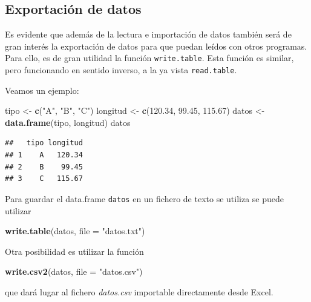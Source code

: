 \documentclass[]{book}
\newenvironment{Shaded}{\begin{snugshade}}{\end{snugshade}}
\newcommand{\KeywordTok}[1]{\textcolor[rgb]{0.13,0.29,0.53}{\textbf{#1}}}
\newcommand{\DataTypeTok}[1]{\textcolor[rgb]{0.13,0.29,0.53}{#1}}
\newcommand{\FloatTok}[1]{\textcolor[rgb]{0.00,0.00,0.81}{#1}}
\newcommand{\StringTok}[1]{\textcolor[rgb]{0.31,0.60,0.02}{#1}}
\newcommand{\NormalTok}[1]{#1}
\begin{document}
\subsection{Exportación de datos}\label{exportacion-de-datos}

Es evidente que además de la lectura e importación de datos también será
de gran interés la exportación de datos para que puedan leídos con otros
programas. Para ello, es de gran utilidad la función
\texttt{write.table}. Esta función es similar, pero funcionando en
sentido inverso, a la ya vista \texttt{read.table}.

Veamos un ejemplo:

\begin{Shaded}
\begin{Highlighting}[]
\NormalTok{tipo <-}\StringTok{ }\KeywordTok{c}\NormalTok{(}\StringTok{"A"}\NormalTok{, }\StringTok{"B"}\NormalTok{, }\StringTok{"C"}\NormalTok{)}
\NormalTok{longitud <-}\StringTok{ }\KeywordTok{c}\NormalTok{(}\FloatTok{120.34}\NormalTok{, }\FloatTok{99.45}\NormalTok{, }\FloatTok{115.67}\NormalTok{)}
\NormalTok{datos <-}\StringTok{ }\KeywordTok{data.frame}\NormalTok{(tipo, longitud)}
\NormalTok{datos}
\end{Highlighting}
\end{Shaded}

\begin{verbatim}
##   tipo longitud
## 1    A   120.34
## 2    B    99.45
## 3    C   115.67
\end{verbatim}

Para guardar el data.frame \texttt{datos} en un fichero de texto se
utiliza se puede utilizar

\begin{Shaded}
\begin{Highlighting}[]
\KeywordTok{write.table}\NormalTok{(datos, }\DataTypeTok{file =} \StringTok{"datos.txt"}\NormalTok{)}
\end{Highlighting}
\end{Shaded}

Otra posibilidad es utilizar la función

\begin{Shaded}
\begin{Highlighting}[]
\KeywordTok{write.csv2}\NormalTok{(datos, }\DataTypeTok{file =} \StringTok{"datos.csv"}\NormalTok{)}
\end{Highlighting}
\end{Shaded}

que dará lugar al fichero \emph{datos.csv} importable directamente desde
Excel.
\end{document}
